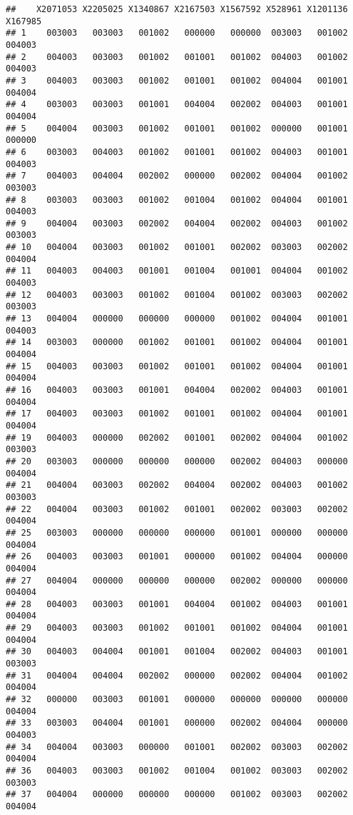 \documentclass[
]{article}
\begin{document}
\begin{verbatim}
##    X2071053 X2205025 X1340867 X2167503 X1567592 X528961 X1201136 X167985
## 1    003003   003003   001002   000000   000000  003003   001002  004003
## 2    004003   003003   001002   001001   001002  004003   001002  004003
## 3    004003   003003   001002   001001   001002  004004   001001  004004
## 4    003003   003003   001001   004004   002002  004003   001001  004004
## 5    004004   003003   001002   001001   001002  000000   001001  000000
## 6    003003   004003   001002   001001   001002  004003   001001  004003
## 7    004003   004004   002002   000000   002002  004004   001002  003003
## 8    003003   003003   001002   001004   001002  004004   001001  004003
## 9    004004   003003   002002   004004   002002  004003   001002  003003
## 10   004004   003003   001002   001001   002002  003003   002002  004004
## 11   004003   004003   001001   001004   001001  004004   001002  004003
## 12   004003   003003   001002   001004   001002  003003   002002  003003
## 13   004004   000000   000000   000000   001002  004004   001001  004003
## 14   003003   000000   001002   001001   001002  004004   001001  004004
## 15   004003   003003   001002   001001   001002  004004   001001  004004
## 16   004003   003003   001001   004004   002002  004003   001001  004004
## 17   004003   003003   001002   001001   001002  004004   001001  004004
## 19   004003   000000   002002   001001   002002  004004   001002  003003
## 20   003003   000000   000000   000000   002002  004003   000000  004004
## 21   004004   003003   002002   004004   002002  004003   001002  003003
## 22   004004   003003   001002   001001   002002  003003   002002  004004
## 25   003003   000000   000000   000000   001001  000000   000000  004004
## 26   004003   003003   001001   000000   001002  004004   000000  004004
## 27   004004   000000   000000   000000   002002  000000   000000  004004
## 28   004003   003003   001001   004004   001002  004003   001001  004004
## 29   004003   003003   001002   001001   001002  004004   001001  004004
## 30   004003   004004   001001   001004   002002  004003   001001  003003
## 31   004004   004004   002002   000000   002002  004004   001002  004004
## 32   000000   003003   001001   000000   000000  000000   000000  004004
## 33   003003   004004   001001   000000   002002  004004   000000  004003
## 34   004004   003003   000000   001001   002002  003003   002002  004004
## 36   004003   003003   001002   001004   001002  003003   002002  003003
## 37   004004   000000   000000   000000   001002  003003   002002  004004

\end{verbatim}
\end{document}
